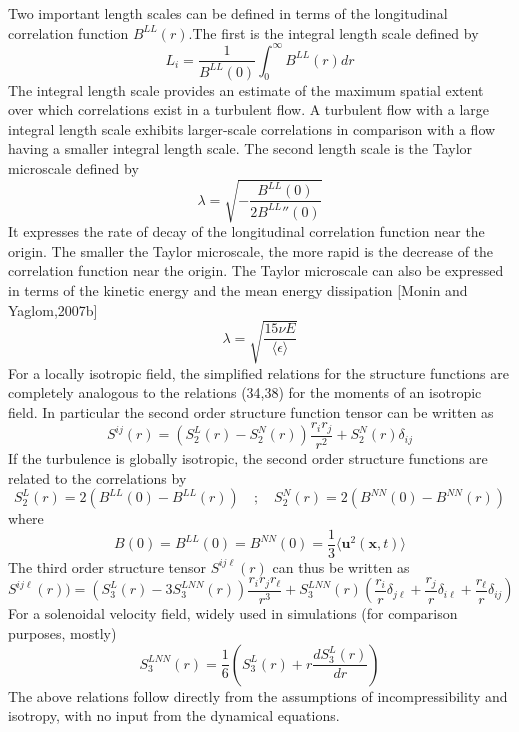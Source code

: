 Two important length scales can be defined in terms of the longitudinal correlation function $B^{LL}(r)$.The first is the integral length scale defined by
\begin{equation}
    L_i=\frac{1}{B^{LL}(0)}\int_0^\infty B^{LL}(r)dr
\end{equation}
The integral length scale provides an estimate of the maximum spatial extent over which correlations exist in a turbulent flow. A turbulent flow with a large integral length scale exhibits larger-scale  correlations in comparison with a flow having a smaller integral length scale. The second length scale  is the Taylor microscale defined by
\begin{equation}
    \lambda=\sqrt{-\frac{B^{LL}(0)}{2{B^{LL}}''(0)}}
\end{equation}
It expresses the rate of decay of the longitudinal correlation function near the origin. The smaller the Taylor microscale, the more rapid is the decrease of the correlation function near the origin. The Taylor microscale can also be expressed in terms of the kinetic energy and the mean energy dissipation [Monin and Yaglom,2007b]
\begin{equation}
    \lambda=\sqrt{\frac{15\nu E}{\langle\epsilon\rangle}}
\end{equation}
For a locally isotropic field, the simplified relations for the structure functions are completely analogous to the relations (34,38) for the moments of an isotropic field. In particular the second order structure function tensor can be written as
\begin{equation}
    S^{ij}(r)=(S_2^L(r)-S_2^N(r))\frac{r_ir_j}{r^2}+S_2^N(r)\delta_{ij}
\end{equation}
If the turbulence is globally isotropic, the second order structure functions are related to the correlations by
\begin{equation}
    S_2^L(r)=2(B^{LL}(0)-B^{LL}(r))\quad;\quad S_2^N(r)=2(B^{NN}(0)-B^{NN}(r))
\end{equation}
where
\begin{equation}
    B(0)=B^{LL}(0)=B^{NN}(0)=\frac{1}{3}\langle\mathbf{u}^2(\mathbf{x},t)\rangle
\end{equation}
The third order structure tensor $S^{ij\ell}(r)$ can thus be written as
\begin{equation}
    S^{ij\ell}(r))=(S_3^L(r)-3S_3^{LNN}(r))\frac{r_ir_jr_\ell}{r^3}+S_3^{LNN}(r)\left(\frac{r_i}{r}\delta_{j\ell}+\frac{r_j}{r}\delta_{i\ell}+\frac{r_\ell}{r}\delta_{ij}\right)
\end{equation}
For a solenoidal velocity field, widely used in simulations (for comparison purposes, mostly)
\begin{equation}
    S_3^{LNN}(r)=\frac{1}{6}\left(S_3^L(r)+r\frac{dS_3^L(r)}{dr}\right)
\end{equation}
The above relations follow directly from the assumptions of incompressibility and isotropy, with no
input from the dynamical equations.
